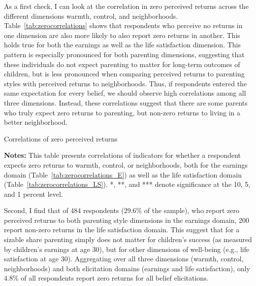 \documentclass[12pt, a4paper, english]{article}
\begin{document}
As a first check, I can look at the correlation in zero perceived returns across the different dimensions warmth, control, and neighborhoods. Table~\ref{tab:zerocorrelations} shows that respondents who perceive no returns in one dimension are also more likely to also report zero returns in another. This holds true for both the earnings as well as the life satisfaction dimension. This pattern is especially pronounced for both parenting dimensions, suggesting that these individuals do not expect parenting to matter for long-term outcomes of children, but is less pronounced when comparing perceived returns to parenting styles with perceived returns to neighborhoods. Thus, if respondents entered the same expectation for every belief, we should observe high correlations among all three dimensions. Instead, these correlations suggest that there are some parents who truly expect zero returns to parenting, but non-zero returns to living in a better neighborhood.

\begin{table}[h!]\centering
    \caption{Correlations of zero perceived returns}\label{tab:zerocorrelations}
    
    \vspace{0.5em}
    \caption*{\footnotesize \textbf{Notes:} This table presents correlations of indicators for whether a respondent expects zero returns to warmth, control, or neighborhoods, both for the earnings domain (Table~\ref{tab:zerocorrelations_E}) as well as the life satisfaction domain (Table~\ref{tab:zerocorrelations_LS}). *, **, and *** denote significance at the 10, 5, and 1 percent level.}
\end{table}

Second, I find that of 484 respondents (29.6\% of the sample), who report zero perceived returns to both parenting style dimensions in the earnings domain, 200 report non-zero returns in the life satisfaction domain. This suggest that for a sizable share parenting simply does not matter for children's success (as measured by children's earnings at age 30), but for other dimensions of well-being (e.g., life satisfaction at age 30). Aggregating over all three dimensions (warmth, control, neighborhoods) and both elicitation domains (earnings and life satisfaction), only 4.8\% of all respondents report zero returns for all belief elicitations.
\end{document}
